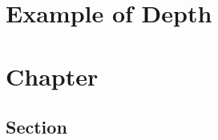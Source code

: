 \documentclass{depth_ebook}
\begin{document}
\chapter*{Example of Depth}
\blindtext[2]

\chapter{Chapter}
\blindtext[2]
\section{Section}
\blindtext[2]
\end{document}

